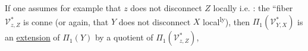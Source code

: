 If one assumes for example that $z$ does not disconnect $Z$ locally i.e. :  the ``fiber $\mathcal V^*_{z,Z}$ is conne
(or again, that $Y$ does not disconnect $X$ local\textsuperscript{ly}), then $\Pi_1(\mathcal V^*_{Y,X})$ is an \uline{extension} of $\Pi_1(Y)$ by a quotient of $\Pi_1(\mathcal V^*_{z,Z})$, 

